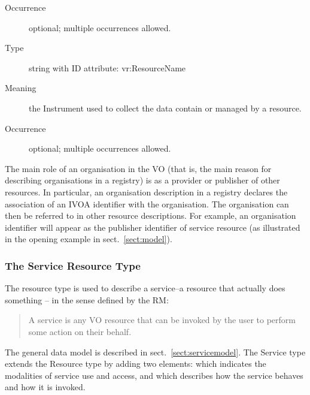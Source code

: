 \documentclass[11pt,a4paper]{ivoa}
\begin{document}
\begin{generated}
\begin{bigdescription}
\begin{description}
\item[Occurrence] optional; multiple occurrences allowed.

\end{description}
\item[Element \xmlel{instrument}]
\begin{description}
\item[Type] string with ID attribute: vr:ResourceName
\item[Meaning]
                       the Instrument used to collect the data contain or
                       managed by a resource.

\item[Occurrence] optional; multiple occurrences allowed.

\end{description}


\end{bigdescription}\endgroup

\endgroup
\end{generated}


The main role of an organisation in the VO (that is, the main reason
for describing organisations in a registry) is as a provider or
publisher of other resources.  In particular, an organisation
description in a registry declares the association of an IVOA
identifier with the organisation.  The
organisation can then be referred to in other resource descriptions.
For example, an organisation identifier will appear as the publisher
identifier of service resource (as illustrated in the opening
example in sect.~\ref{sect:model}).


\subsubsection{The Service Resource Type}


The  resource type is used to describe a service--a resource
that actually does something -- in the sense defined by the
RM:

\begin{quotation}
\noindent A service is any VO resource that can be invoked by the user to
perform some action on their behalf.
\end{quotation}


The general data model is described in sect.~\ref{sect:servicemodel}.
The Service type extends the Resource type by adding two elements:
 which indicates the modalities of service use and access, and
 which describes how the service behaves and how it is
invoked.
\end{document}
